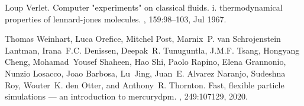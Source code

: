 \documentclass[Afour,sageh,times]{sagej}
\begin{document}
\begin{thebibliography}{99}
Loup Verlet.
\newblock Computer "experiments" on classical fluids. i. thermodynamical
  properties of lennard-jones molecules.
, 159:98--103, Jul 1967.

Thomas Weinhart, Luca Orefice, Mitchel Post, Marnix~P. {van Schrojenstein
  Lantman}, Irana~F.C. Denissen, Deepak~R. Tunuguntla, J.M.F. Tsang, Hongyang
  Cheng, Mohamad~Yousef Shaheen, Hao Shi, Paolo Rapino, Elena Grannonio, Nunzio
  Losacco, Joao Barbosa, Lu~Jing, Juan~E. {Alvarez Naranjo}, Sudeshna Roy,
  Wouter~K. {den Otter}, and Anthony~R. Thornton.
\newblock Fast, flexible particle simulations — an introduction to
  mercurydpm.
, 249:107129, 2020.

\end{thebibliography}
\end{document}
